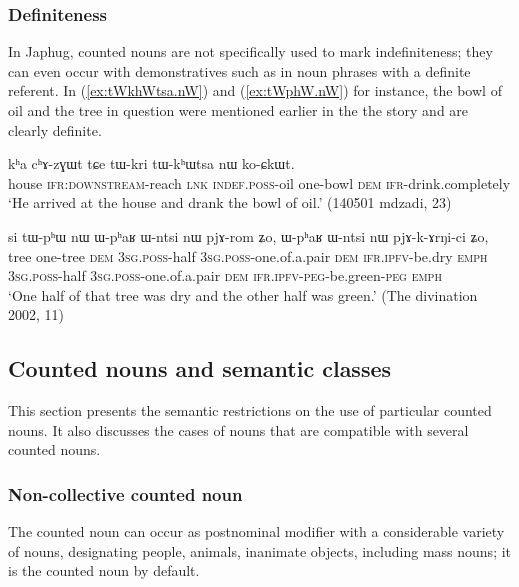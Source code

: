 \subsubsection{Definiteness} \label{sec:CN.definiteness}
In Japhug, counted nouns are not specifically used to mark indefiniteness; they can even occur with demonstratives such as  in noun phrases with a definite referent. In  (\ref{ex:tWkhWtsa.nW}) and (\ref{ex:tWphW.nW}) for instance, the bowl of oil and the tree in question were mentioned earlier in the  the story and are clearly definite.

\begin{exe}
	\ex \label{ex:tWkhWtsa.nW}
	\gll kʰa cʰɤ-zɣɯt tɕe tɯ-kri tɯ-kʰɯtsa nɯ ko-ɕkɯt.  \\
	house \textsc{ifr}:\textsc{downstream}-reach \textsc{lnk} \textsc{indef}.\textsc{poss}-oil one-bowl \textsc{dem} \textsc{ifr}-drink.completely \\
	\glt `He arrived at the house and drank the bowl of oil.' (140501 mdzadi, 23)
\end{exe}

\begin{exe}
	\ex \label{ex:tWphW.nW}
	\gll si tɯ-pʰɯ nɯ ɯ-pʰaʁ ɯ-ntsi nɯ pjɤ-rom ʑo, ɯ-pʰaʁ ɯ-ntsi nɯ pjɤ-k-ɤrŋi-ci ʑo, \\
	tree one-tree \textsc{dem} \textsc{3sg}.\textsc{poss}-half \textsc{3sg}.\textsc{poss}-one.of.a.pair \textsc{dem} \textsc{ifr}.\textsc{ipfv}-be.dry \textsc{emph} \textsc{3sg}.\textsc{poss}-half \textsc{3sg}.\textsc{poss}-one.of.a.pair \textsc{dem} \textsc{ifr}.\textsc{ipfv}-\textsc{peg}-be.green-\textsc{peg} \textsc{emph} \\
	\glt `One half of that tree was dry and the other half was green.' (The divination 2002, 11)
\end{exe}


\subsection{Counted nouns and semantic classes} \label{sec:CN.classification}

This section presents the semantic restrictions on the use of particular counted nouns. It also discusses the cases of nouns that are compatible with several counted nouns.

\subsubsection{Non-collective counted noun}
The counted noun  can occur as postnominal modifier with a considerable variety of nouns, designating people, animals, inanimate objects, including mass nouns; it is the counted noun by default.

